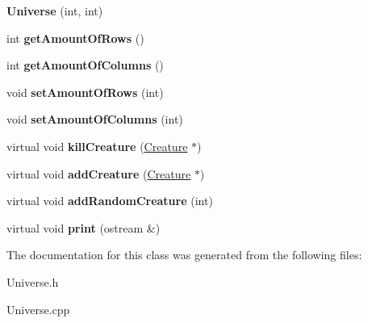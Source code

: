 \begin{DoxyCompactItemize}
\item 
{\bfseries Universe} (int, int)\hypertarget{class_universe_ad3f8dfc7f0c2e14d08779fc84a8d893a}{}\label{class_universe_ad3f8dfc7f0c2e14d08779fc84a8d893a}

\item 
int {\bfseries get\+Amount\+Of\+Rows} ()\hypertarget{class_universe_a8f219d93acf88902438497356fb4b79d}{}\label{class_universe_a8f219d93acf88902438497356fb4b79d}

\item 
int {\bfseries get\+Amount\+Of\+Columns} ()\hypertarget{class_universe_a5b0a0f6b1927e223b0a18f2474a05711}{}\label{class_universe_a5b0a0f6b1927e223b0a18f2474a05711}

\item 
void {\bfseries set\+Amount\+Of\+Rows} (int)\hypertarget{class_universe_af0124aca57a7ff286132e8525bd1c378}{}\label{class_universe_af0124aca57a7ff286132e8525bd1c378}

\item 
void {\bfseries set\+Amount\+Of\+Columns} (int)\hypertarget{class_universe_a9597c59c4bf80e17c852596acf25dfc4}{}\label{class_universe_a9597c59c4bf80e17c852596acf25dfc4}

\item 
virtual void {\bfseries kill\+Creature} (\hyperlink{class_creature}{Creature} $\ast$)\hypertarget{class_universe_a168e0f7fcb842adb68cbec81e0824f69}{}\label{class_universe_a168e0f7fcb842adb68cbec81e0824f69}

\item 
virtual void {\bfseries add\+Creature} (\hyperlink{class_creature}{Creature} $\ast$)\hypertarget{class_universe_a0b3d168c51db2f2f659cfddce03394dd}{}\label{class_universe_a0b3d168c51db2f2f659cfddce03394dd}

\item 
virtual void {\bfseries add\+Random\+Creature} (int)\hypertarget{class_universe_aa315baa2ff875cdc7ed127fa5508c119}{}\label{class_universe_aa315baa2ff875cdc7ed127fa5508c119}

\item 
virtual void {\bfseries print} (ostream \&)\hypertarget{class_universe_a8c55b38c4c100c8f810f46a4a4ec779e}{}\label{class_universe_a8c55b38c4c100c8f810f46a4a4ec779e}

\end{DoxyCompactItemize}


The documentation for this class was generated from the following files\+:\begin{DoxyCompactItemize}
\item 
Universe.\+h\item 
Universe.\+cpp\end{DoxyCompactItemize}
